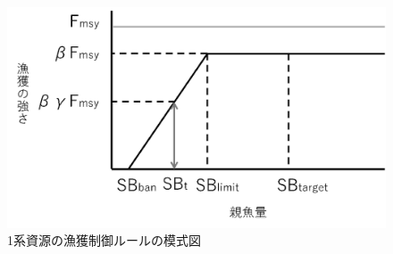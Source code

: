 \documentclass[11pt]{jsarticle}
\begin{document}
\begin{figure}[h]
  \includegraphics[bb=0 0 600 300, width=13cm]{fig_HCR.png}
  \caption{1系資源の漁獲制御ルールの模式図}
  \label{fig_HCR}
\end{figure}
\end{document}
